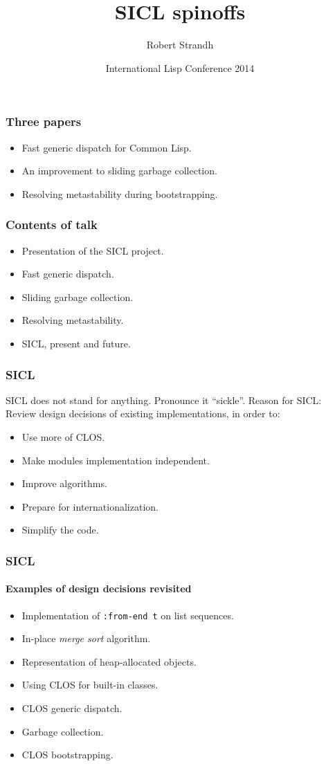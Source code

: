 \documentclass{beamer}
\title{SICL spinoffs}
\author{Robert Strandh\inst{1}}
\institute{\inst{1}Université de Bordeaux}
\date[ILC 2014]{International Lisp Conference 2014}
\begin{document}
\begin{frame}
  \titlepage
\end{frame}
\begin{frame}
  \frametitle{Three papers}

  \begin{itemize}
  \item Fast generic dispatch for Common Lisp.
  \item An improvement to sliding garbage collection.
  \item Resolving metastability during bootstrapping.
  \end{itemize}
\end{frame}
\begin{frame}
  \frametitle{Contents of talk}

  \begin{itemize}
  \item Presentation of the SICL project.
  \item Fast generic dispatch.
  \item Sliding garbage collection.
  \item Resolving metastability.
  \item SICL, present and future.
  \end{itemize}
\end{frame}
\begin{frame}
  \frametitle{SICL}

  SICL does not stand for anything.  Pronounce it ``sickle''.
  \vskip 0.25cm
  Reason for SICL: Review design decisions of existing
  implementations, in order to:
  
  \begin{itemize}
  \item Use more of CLOS.
  \item Make modules implementation independent.
  \item Improve algorithms.
  \item Prepare for internationalization. 
  \item Simplify the code. 
  \end{itemize}
\end{frame}
\begin{frame}
  \frametitle{SICL}
  \framesubtitle{Examples of design decisions revisited}

  \begin{itemize}
  \item Implementation of \texttt{:from-end t} on list sequences.
  \item In-place \emph{merge sort} algorithm. 
  \item Representation of heap-allocated objects.
  \item Using CLOS for built-in classes.
  \item CLOS generic dispatch.
  \item Garbage collection.
  \item CLOS bootstrapping.
  \end{itemize}
\end{frame}
\end{document}
